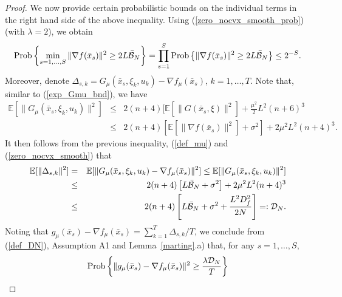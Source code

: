 \documentclass[final]{siamltex}
\newcommand{\beq}{\begin{equation}}
\newcommand{\eeq}{\end{equation}}
\newcommand{\beqa}{\begin{eqnarray}}
\newcommand{\eeqa}{\end{eqnarray}}
\newcommand{\beqas}{\begin{eqnarray*}}
\newcommand{\eeqas}{\end{eqnarray*}}
\newcommand{\nn}{\nonumber}
\def\eqnok#1{(\ref{#1})}
\def\prob{{\rm Prob}}
\newcommand{\bbe}{\mathbb{E}}
\def\prob{\mathop{\rm Prob}}
\def\cB{{\cal B}}
\def\cD{{\cal D}}
\begin{document}
\begin{proof}
We now provide certain probabilistic bounds on the individual terms in the right hand side of
the above inequality.
Using \eqnok{zero_nocvx_smooth_prob} (with $\lambda = 2$), we obtain
\beq \label{zero_opt_phase_result}
\prob \left\{
\min_{s= 1, \ldots, S} \|\nabla f(\bar x_s)\|^2 \ge
2 L \bar{\cB}_N\right\} = \prod_{s=1}^S \prob\left\{\|\nabla f(\bar x_s)\|^2 \ge
2 L \bar{\cB}_N \right\} \le 2^{-S}. %
\eeq
Moreover, denote $\Delta_{s,k} = G_{\mu}(\bar x_s, \xi_k, u_k) - \nabla f_{\mu}(\bar x_s)$, $k = 1, \ldots, T$.
Note that, similar to \eqnok{exp_Gmu_bnd}, we have
\beqas
\bbe [\|G_{\mu}(\bar x_s, \xi_k, u_k)\|^2]
&\le& 2(n+4) [\bbe [\|G(\bar x_s, \xi)\|^2] + \frac{\mu^2}{2} L^2 (n+6)^3  \\
&\le& 2(n+4) [\bbe [\|\nabla f(\bar x_s)\|^2] +\sigma^2]+2 \mu^2 L^2 (n+4)^3.
\eeqas
It then follows from the previous inequality, \eqnok{def_mu} and \eqnok{zero_nocvx_smooth}
that
\beqa
\bbe [\|\Delta_{s,k}\|^2] &=& \bbe [\|G_{\mu}(\bar x_s, \xi_k, u_k) - \nabla f_{\mu}(\bar x_s)\|^2]
\le \bbe [\|G_{\mu}(\bar x_s, \xi_k, u_k)\|^2] \nn\\
&\le&
 2(n+4) \left[L \bar{\cB}_N + \sigma^2\right] + 2 \mu^2 L^2 (n+4)^3\nn \\
&\le& 2(n+4) \left[L \bar{\cB}_N + \sigma^2+\frac{L^2D_f^2}{2N}\right]=:\cD_N. \label{def_DN}
\eeqa
Noting that $g_{\mu}(\bar x_s) - \nabla f_{\mu}(\bar x_s) = \sum_{k=1}^T \Delta_{s,k} / T$, we conclude
from \eqnok{def_DN}, Assumption A1 and Lemma~\ref{marting}.a) that, for any $s = 1, \ldots, S$,
\[
\prob\left\{ \|g_{\mu}(\bar x_s) - \nabla f_{\mu}(\bar x_s)\|^2 \ge  \frac{\lambda \cD_N}{T} \right\}
\]
\end{proof}
\end{document}
